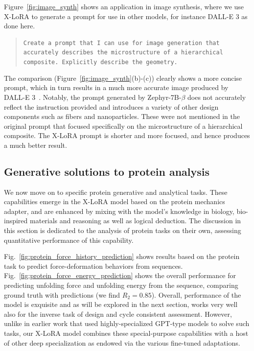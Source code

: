 Figure~\ref{fig:image_synth} shows an application in image synthesis, where we use X-LoRA to generate a prompt for use in other models, for instance DALL-E 3 as done here. 
\begin{quote}
\small\texttt{Create a prompt that I can use for image generation that accurately describes the microstructure of a hierarchical composite.
\newline\newline
Explicitly describe the geometry.}
\end{quote}
The comparison (Figure~\ref{fig:image_synth}(b)-(c)) clearly shows a more concise prompt, which in turn results in a much more accurate image produced by DALL-E 3~\cite{DALLECard}. Notably, the prompt generated by Zephyr-7B-$\beta$ does not accurately reflect the instruction provided and introduces a variety of other design components such as fibers and nanoparticles. These were not mentioned in the original prompt that focused specifically on the microstructure of a hierarchical composite. The X-LoRA prompt is shorter and more focused, and hence produces a much better result. 






  
\subsection{Generative solutions to protein analysis}

We now move on to specific protein generative and analytical tasks. These capabilities emerge in the X-LoRA model based on the protein mechanics adapter, and are enhanced by mixing with the model's knowledge in biology, bio-inspired materials and reasoning as well as logical deduction. The discussion in this section is dedicated to the analysis of protein tasks on their own, assessing quantitative performance of this capability. 

Fig.~\ref{fig:protein_force_history_prediction} shows results based on the protein task to predict force-deformation behaviors from sequences.  Fig.~\ref{fig:protein_force_energy_prediction} shows  the overall performance for predicting unfolding force and unfolding energy from the sequence, comparing ground truth with predictions (we find $R_2=0.85$). Overall, performance of the model is exquisite and as will be explored in the next section, works very well also for the inverse task of design and cycle consistent assessment\cite{Lu2023GenerativePropertiesb}. However, unlike in earlier work that used highly-specialized GPT-type models to solve such tasks, our X-LoRA model combines these special-purpose capabilities with a host of other deep specialization as endowed via the various fine-tuned adaptations.  






